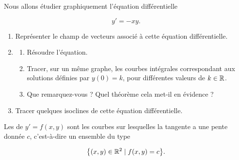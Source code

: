 \begin{frame}
\begin{tp}
Nous allons étudier graphiquement l'équation différentielle 

\vspace*{-2ex} 

  $$y' = -xy.$$
  
\vspace*{-1ex}  
  
\begin{enumerate}
  \item Représenter le champ de vecteurs associé à cette équation différentielle.
 
  \item 
  \begin{enumerate}
    \item Résoudre l'équation.
    
    \item Tracer, sur un même graphe, les courbes intégrales correspondant aux solutions
    définies par $y(0)=k$, pour différentes valeurs de $k\in\mathbb{R}$.
    
    \item Que remarquez-vous ? Quel théorème cela met-il en évidence ? 
  \end{enumerate}
  
  \item Tracer quelques isoclines de cette équation différentielle.
\end{enumerate}
\end{tp}

\pause

Les  de $y' = f(x,y)$ sont les courbes sur lesquelles la tangente a 
une pente donnée $c$, c'est-à-dire un ensemble du type 

\vspace*{-2ex}
$$\big\lbrace (x,y) \in \mathbb{R}^2 \mid f(x,y) = c \big\rbrace.$$
\end{frame}


